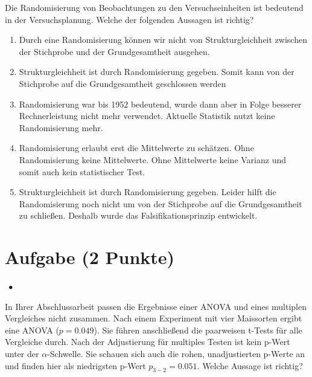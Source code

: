 \documentclass[a4paper, 9pt]{scrartcl}\usepackage[]{graphicx}\usepackage[]{xcolor}
\begin{document}
{Die Randomisierung von Beobachtungen zu den Versuchseinheiten ist bedeutend in der Versuchsplanung. Welche der folgenden Aussagen ist richtig?



\begin{enumerate}
\item [\textbf{A} \msquare] Durch eine Randomisierung können wir nicht von Strukturgleichheit zwischen der Stichprobe und der Grundgesamtheit ausgehen.
\item [\textbf{B} \msquare] Strukturgleichheit ist durch Randomisierung gegeben. Somit kann von der Stichprobe auf die Grundgesamtheit geschlossen werden
\item [\textbf{C} \msquare] Randomisierung war bis 1952 bedeutend, wurde dann aber in Folge besserer Rechnerleistung nicht mehr verwendet. Aktuelle Statistik nutzt keine Randomisierung mehr.
\item [\textbf{D} \msquare] Randomisierung erlaubt erst die Mittelwerte zu schätzen. Ohne Randomisierung keine Mittelwerte. Ohne Mittelwerte keine Varianz und somit auch kein statistischer Test.
\item [\textbf{E} \msquare] Strukturgleichheit ist durch Randomisierung gegeben. Leider hilft die Randomisierung noch nicht um von der Stichprobe auf die Grundgesamtheit zu schließen. Deshalb wurde das Falsifikationsprinzip entwickelt.
\end{enumerate} 

\section{Aufgabe \hfill (2 Punkte)}

\ifcollection
\begin{flushright}
\tiny\vspace{-2Ex}
\textbf{\examinhaltstart}
\exammodulestatversuch $\;\bullet$
\exammodulebiostat
\vspace{-1Ex}
\end{flushright}
\fi




In Ihrer Abschlussarbeit passen die Ergebnisse einer ANOVA und eines multiplen Vergleiches nicht zusammen. Nach einem Experiment mit vier Maissorten ergibt eine ANOVA ($p = 0.049$). Sie führen anschließend die paarweisen t-Tests für alle Vergleiche durch. Nach der Adjustierung für multiples Testen ist kein p-Wert unter der $\alpha$-Schwelle. Sie schauen sich auch die rohen, unadjustierten p-Werte an und finden hier als niedrigsten p-Wert $p_{3-2} = 0.051$. Welche Aussage ist richtig?




}
\end{document}

